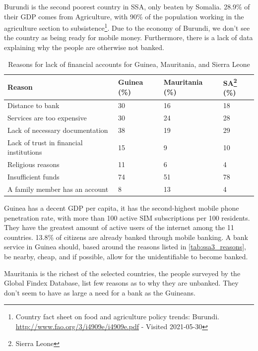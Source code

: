 \documentclass[11pt, a4paper]{article}
\begin{document}

Burundi is the second poorest country in SSA, only beaten by Somalia\cite{wbdata}. 28.9\%\cite{wbdata} of their GDP comes from Agriculture, with 90\% of the population working in the agriculture section to subsistence\footnote{Country fact sheet on food and agriculture policy trends: Burundi. \url{http://www.fao.org/3/i4909e/i4909e.pdf} - Visited 2021-05-30}. Due to the economy of Burundi, we don't see the country as being ready for mobile money. Furthermore, there is a lack of data explaining why the people are otherwise not banked.

\begin{table}[!ht]
\centering
\begin{tabular}{|l|l|l|l|}
\hline
\textbf{Reason} & \textbf{Guinea (\%)} & \textbf{Mauritania (\%)} & \textbf{SA}\footnote{Sierra Leone} (\%) \\ \hline
Distance to bank & 30 & 16 & 18 \\ \hline
Services are too expensive & 30 & 24 & 28 \\ \hline
Lack of necessary documentation & 38 & 19 & 29 \\ \hline
Lack of trust in financial institutions & 15 & 9 & 10 \\ \hline
Religious reasons & 11 & 6 & 4 \\ \hline
Insufficient funds & 74 & 51 & 78 \\ \hline
A family member has an account & 8 & 13 & 4\\ \hline
\end{tabular}
\caption{Reasons for lack of financial accounts for Guinea, Mauritania, and Sierra Leone\cite{gfindex}}
\label{tab:ssa3_reasons}
\end{table}


Guinea has a decent GDP per capita, it has the second-highest mobile phone penetration rate, with more than 100 active SIM subscriptions per 100 residents. They have the greatest amount of active users of the internet among the 11 countries. 13.8\% of citizens are already banked through mobile banking. A bank service in Guinea should, based around the reasons listed in \autoref{tab:ssa3_reasons}, be nearby, cheap, and if possible, allow for the unidentifiable to become banked.

Mauritania is the richest of the selected countries, the people surveyed by the Global Findex Database\cite{gfindex}, list few reasons as to why they are unbanked. They don't seem to have as large a need for a bank as the Guineans.
\end{document}
